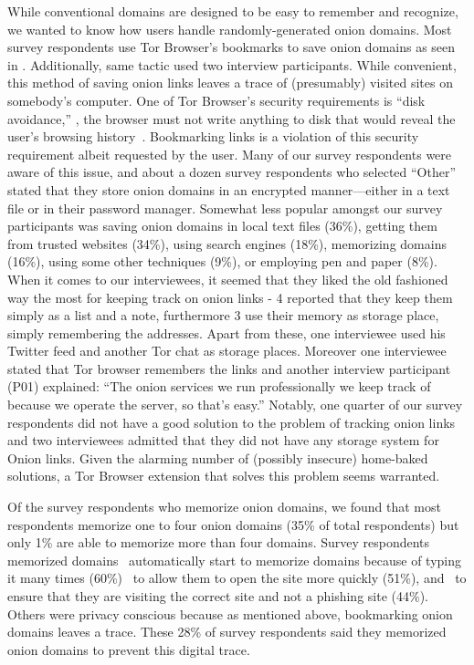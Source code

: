 While conventional domains are designed to be easy to remember and recognize, we
wanted to know how users handle randomly-generated onion domains. Most survey
respondents use Tor Browser's bookmarks to save onion domains as seen in
. Additionally, same tactic used two interview
participants.   While convenient, this method of saving onion links leaves a
trace of (presumably) visited sites on somebody's computer.  One of Tor
Browser's security requirements is ``disk avoidance,'' \ie, the browser must not
write anything to disk that would reveal the user's browsing
history~\cite[\S~2.1]{Perry2017a}.  Bookmarking links is a violation of this
security requirement albeit requested by the user.  Many of our survey
respondents were aware of this issue, and about a dozen survey respondents who
selected ``Other'' stated that they store onion domains in an encrypted
manner---either in a text file or in their password manager.  Somewhat less
popular amongst our survey participants was saving onion domains in local text
files (36\%), getting them from trusted websites (34\%), using search engines
(18\%), memorizing domains (16\%), using some other techniques (9\%), or
employing pen and paper (8\%).  When it comes to our interviewees, it seemed
that they liked the old fashioned way the most for keeping track on onion links
- 4 reported that they keep them simply as a list and a note, furthermore 3 use
their memory as storage place, simply remembering the addresses. Apart from
these, one interviewee used his Twitter feed and another Tor chat as storage
places. Moreover one interviewee stated that Tor browser remembers the links and
another interview participant (P01) explained: ``The onion services we run
professionally we keep track of because we operate the server, so that's easy.''
Notably, one quarter of our survey respondents did not have a good solution to
the problem of tracking onion links and  two interviewees admitted that they did
not have any storage system for Onion links.  Given the alarming number of
(possibly insecure) home-baked solutions, a Tor Browser extension that solves
this problem seems warranted.

Of the survey respondents who memorize onion domains, we found that most
respondents memorize one to four onion domains (35\% of total respondents) but
only 1\% are able to memorize more than four domains.   Survey respondents
memorized domains \first~automatically start to memorize domains because of
typing it many times (60\%) \second~to allow them to open the site more quickly
(51\%), and \third~to ensure that they are visiting the correct site and not a
phishing site (44\%). Others were privacy conscious because as mentioned above,
bookmarking onion domains leaves a trace. These 28\% of survey respondents said
they memorized onion domains to prevent this digital trace.

